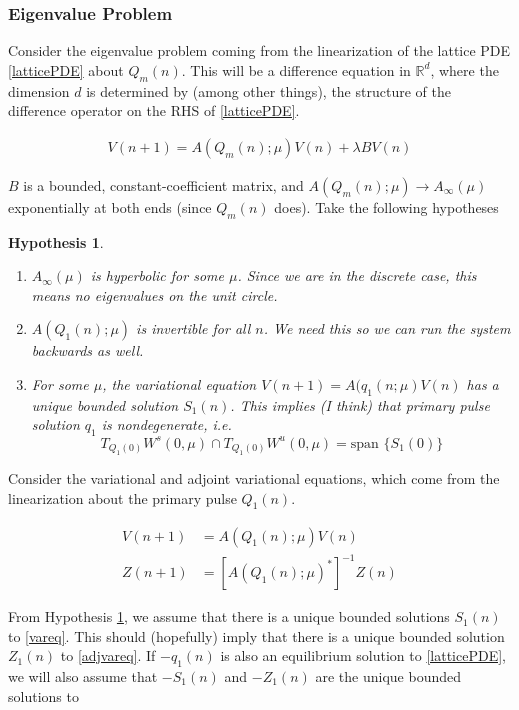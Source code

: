 \documentclass[12pt]{article}
\def\R{{\mathbb R}}
\newtheorem{hypothesis}{Hypothesis}
\begin{document}
\subsubsection{Eigenvalue Problem}

Consider the eigenvalue problem coming from the linearization of the lattice PDE \eqref{latticePDE} about $Q_m(n)$. This will be a difference equation in $\R^d$, where the dimension $d$ is determined by (among other things), the structure of the difference operator on the RHS of \eqref{latticePDE}.

\begin{align*}
V(n+1) = A(Q_m(n); \mu) V(n) + \lambda B V(n)
\end{align*}

$B$ is a bounded, constant-coefficient matrix, and $A(Q_m(n); \mu) \rightarrow A_\infty(\mu)$ exponentially at both ends (since $Q_m(n)$ does). Take the following hypotheses

\begin{hypothesis}\label{initialhyp}
\[\]
\begin{enumerate}
	\item $A_\infty(\mu)$ is hyperbolic for some $\mu$. Since we are in the discrete case, this means no eigenvalues on the unit circle.
	\item $A(Q_1(n); \mu)$ is invertible for all $n$. We need this so we can run the system backwards as well.
	\item For some $\mu$, the variational equation $V(n+1) = A(q_1(n; \mu) V(n)$ has a unique bounded solution $S_1(n)$. This implies (I think) that primary pulse solution $q_1$ is nondegenerate, i.e. 
	\[
	T_{Q_1(0)}W^s(0, \mu) \cap T_{Q_1(0)}W^u(0, \mu) = \text{span }\{ S_1(0) \}
	\]
\end{enumerate}
\end{hypothesis}

Consider the variational and adjoint variational equations, which come from the linearization about the primary pulse $Q_1(n)$.

\begin{align}
V(n+1) &= A(Q_1(n); \mu) V(n) \label{vareq} \\
Z(n+1) &= [A(Q_1(n); \mu)^*]^{-1} Z(n) \label{adjvareq}
\end{align}

From Hypothesis \ref{initialhyp}, we assume that there is a unique bounded solutions $S_1(n)$ to \eqref{vareq}. This should (hopefully) imply that there is a unique bounded solution $Z_1(n)$ to \eqref{adjvareq}. If $-q_1(n)$ is also an equilibrium solution to \eqref{latticePDE}, we will also assume that $-S_1(n)$ and $-Z_1(n)$ are the unique bounded solutions to 
\end{document}
